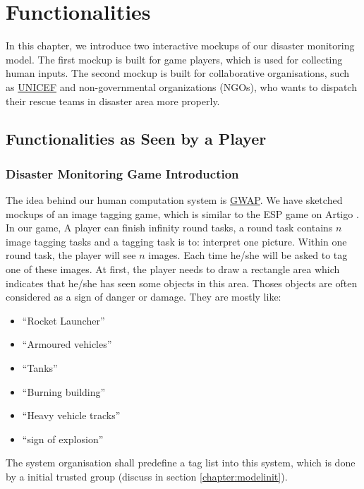 \section{Functionalities}
\label{chapter:func}

In this chapter,
we introduce two interactive mockups of our disaster monitoring model.
The first mockup is built for game players,
which is used for collecting human inputs.
The second mockup is built for collaborative organisations,
such as \hyperref[idx:unicef]{UNICEF} and non-governmental organizations (NGOs),
who wants to dispatch their rescue teams in disaster area more properly. 

\subsection{Functionalities as Seen by a Player}

\subsubsection{Disaster Monitoring Game Introduction}
The idea behind our human computation system is \hyperref[idx:gwap]{GWAP}.
We have sketched mockups of an image tagging game,
which is similar to the ESP game on Artigo \cite{von2005esp, wieser2013artigo}.
In our game,
A player can finish infinity round tasks, 
a round task contains $n$ image tagging tasks and a tagging task is to: interpret one picture.
Within one round task, the player will see $n$ images.
Each time he/she will be asked to tag one of these images.
At first,
the player needs to draw a rectangle area which indicates that he/she has seen some objects in this area.
Thoses objects are often considered as a sign of danger or damage.
They are mostly like:

\begin{itemize}
  \item ``Rocket Launcher''
  \item ``Armoured vehicles''
  \item ``Tanks''
  \item ``Burning building''
  \item ``Heavy vehicle tracks''
  \item ``sign of explosion''
\end{itemize}

The system organisation shall predefine a tag list into this system, 
which is done by a initial trusted group (discuss in section \ref{chapter:modelinit}).

